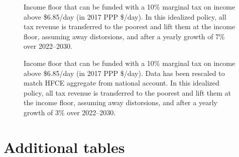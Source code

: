 \documentclass[12pt,english]{article}
\begin{document}
\begin{figure}[!htb]
  \caption[Income floor of 10\% tax above \$6.85/day after 7\% growth.]{Income floor that can be funded with a 10\% marginal tax on income above \$6.85/day (in 2017 PPP \$/day). In this idealized policy, all tax revenue is transferred to the poorest and lift them at the income floor, assuming away distorsions, and after a yearly growth of 7\% over 2022--2030. 
  }\label{fig:demogrant_7__10_very_optimistic}
\end{figure}

\FloatBarrier
\begin{figure}[!htb]
  \caption[Income floor of 10\% tax above \$6.85/day after 3\% growth (HFCE-scaled).]{Income floor that can be funded with a 10\% marginal tax on income above \$6.85/day (in 2017 PPP \$/day). Data has been rescaled to match HFCE aggregate from national account. In this idealized policy, all tax revenue is transferred to the poorest and lift them at the income floor, assuming away distorsions, and after a yearly growth of 3\% over 2022--2030. 
  }\label{fig:s_demogrant_7__10}
\end{figure}

\section{Additional tables}








\end{document}
